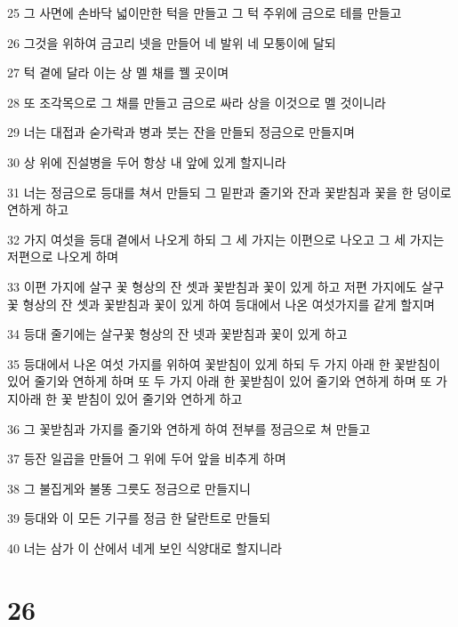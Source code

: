 \par 25 그 사면에 손바닥 넓이만한 턱을 만들고 그 턱 주위에 금으로 테를 만들고
\par 26 그것을 위하여 금고리 넷을 만들어 네 발위 네 모퉁이에 달되
\par 27 턱 곁에 달라 이는 상 멜 채를 꿸 곳이며
\par 28 또 조각목으로 그 채를 만들고 금으로 싸라 상을 이것으로 멜 것이니라
\par 29 너는 대접과 숟가락과 병과 붓는 잔을 만들되 정금으로 만들지며
\par 30 상 위에 진설병을 두어 항상 내 앞에 있게 할지니라
\par 31 너는 정금으로 등대를 쳐서 만들되 그 밑판과 줄기와 잔과 꽃받침과 꽃을 한 덩이로 연하게 하고
\par 32 가지 여섯을 등대 곁에서 나오게 하되 그 세 가지는 이편으로 나오고 그 세 가지는 저편으로 나오게 하며
\par 33 이편 가지에 살구 꽃 형상의 잔 셋과 꽃받침과 꽃이 있게 하고 저편 가지에도 살구꽃 형상의 잔 셋과 꽃받침과 꽃이 있게 하여 등대에서 나온 여섯가지를 같게 할지며
\par 34 등대 줄기에는 살구꽃 형상의 잔 넷과 꽃받침과 꽃이 있게 하고
\par 35 등대에서 나온 여섯 가지를 위하여 꽃받침이 있게 하되 두 가지 아래 한 꽃받침이 있어 줄기와 연하게 하며 또 두 가지 아래 한 꽃받침이 있어 줄기와 연하게 하며 또 가지아래 한 꽃 받침이 있어 줄기와 연하게 하고
\par 36 그 꽃받침과 가지를 줄기와 연하게 하여 전부를 정금으로 쳐 만들고
\par 37 등잔 일곱을 만들어 그 위에 두어 앞을 비추게 하며
\par 38 그 불집게와 불똥 그릇도 정금으로 만들지니
\par 39 등대와 이 모든 기구를 정금 한 달란트로 만들되
\par 40 너는 삼가 이 산에서 네게 보인 식양대로 할지니라

\chapter{26}

